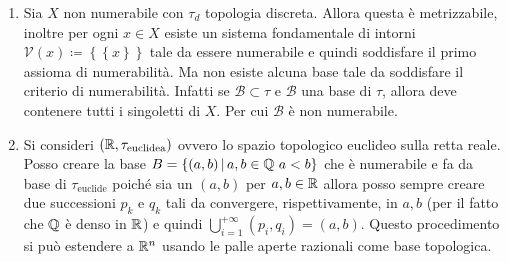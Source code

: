 \begin{example}	
\begin{enumerate}
	\item Sia $X$ non numerabile con $\tau_d$ topologia discreta. Allora questa è metrizzabile, inoltre per ogni $x\in X$ esiste un sistema fondamentale di intorni $\mathcal{V}(x) \coloneqq \left\{ \left\{x \right\} \right\}$ tale da essere numerabile e quindi soddisfare il primo assioma di numerabilità. Ma non esiste alcuna base tale da soddisfare il  criterio di numerabilità. Infatti se $\mathcal{B} \subset \tau$ e $\mathcal{B}$ una base di $\tau$, allora deve contenere tutti i singoletti di $X$. Per cui $\mathcal{B}$ è non numerabile.
	\item Si consideri $(\mathbb{R}, \tau_{\text{euclidea}})$ ovvero lo spazio topologico euclideo sulla retta reale. Posso creare la base $B = \left\{(a,b) \,\middle|\, a,b \in \mathbb{Q}\ a < b\right\}$  che è numerabile e fa da base di $\tau_{\text{euclide}}$ poiché sia un $(a,b)$ per $a,b \in \mathbb{R}$ allora posso sempre creare due successioni $p_k$ e $q_k$ tali da convergere, rispettivamente, in $a, b$  (per il fatto che $\mathbb{Q}$ è denso in $\mathbb{R}$) e quindi $\bigcup_{i=1}^{+\infty}(p_i, q_i) = (a,b)$. Questo procedimento si può estendere a $\mathbb{R}^n$ usando le palle aperte razionali come base topologica.
\end{enumerate}
\end{example}



